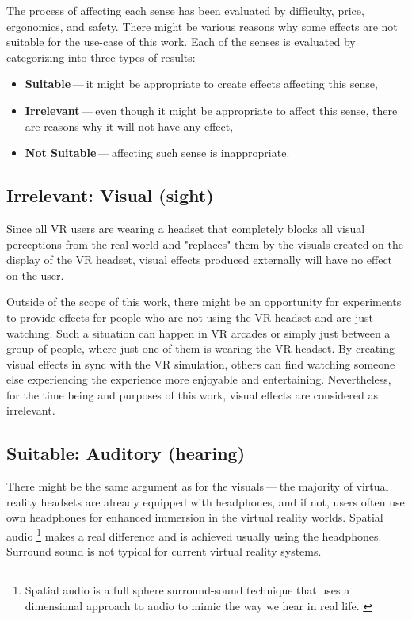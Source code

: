 The process of affecting each sense has been evaluated by difficulty,
price, ergonomics, and safety. There might be various reasons why some
effects are not suitable for the use-case of this work.
Each of the senses is evaluated by categorizing into three types of results:


\begin{itemize}

\item \textbf{Suitable} — it might be appropriate to create effects affecting this sense,

\item \textbf{Irrelevant} — even though it might be appropriate to affect this sense,
there are reasons why it will not have any effect,

\item \textbf{Not Suitable} — affecting such sense is inappropriate.

\end{itemize}


\hypertarget{x-irrelevant:-visual-(sight)}{\subsection{Irrelevant: Visual (sight)}}
Since all VR users are wearing a headset that completely blocks
all visual perceptions from the real world and "replaces" them by the visuals
created on the display of the VR headset, visual effects produced externally
will have no effect on the user.


Outside of the scope of this work, there might be an opportunity for experiments
to provide effects for people who are not using the VR headset and are
just watching. Such a situation can happen in VR arcades or simply
just between a group of people, where just one of them is wearing the VR headset.
By creating visual effects in sync with the VR
simulation, others can find watching someone else experiencing the experience
more enjoyable and entertaining. Nevertheless, for the time being and purposes
of this work, visual effects are considered as irrelevant.


\hypertarget{x-suitable:-auditory-(hearing)}{\subsection{Suitable: Auditory (hearing)}}
There might be the same argument as for the visuals — the majority of virtual reality headsets are already equipped with
headphones, and if not, users often use own headphones for
enhanced immersion in the virtual reality worlds.
Spatial audio
\footnote{Spatial audio is a full sphere surround-sound technique that uses a 
dimensional approach to audio to mimic the way we hear in real life. \cite{spaudio}}
makes a real difference and is achieved usually using the headphones.
Surround sound is not typical for current virtual reality systems.


